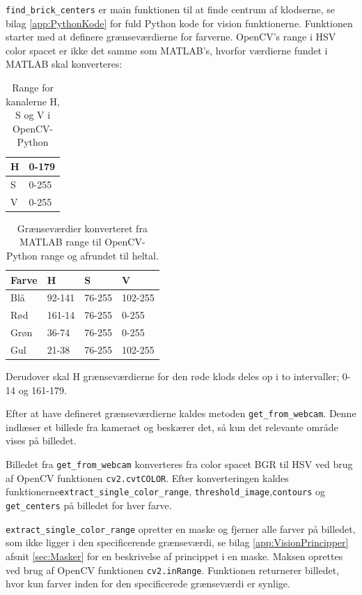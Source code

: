 \texttt{find\_brick\_centers} er main funktionen til at finde centrum af klodserne, se bilag \vref{app:PythonKode} for fuld Python kode for vision funktionerne.
Funktionen starter med at definere grænseværdierne for farverne.
OpenCV's range i HSV color spacet er ikke det samme som MATLAB's, hvorfor værdierne fundet i MATLAB skal konverteres:
\begin{table}[H]
\centering
\begin{tabular}{l|l}
H		&	0-179\\
\hline
S		&	0-255\\
\hline
V		&	0-255\\
\end{tabular}	
\caption{Range for kanalerne H, S og V i OpenCV-Python}
\end{table}

\begin{table}[H]
\centering
\begin{tabular}{l|l|l|l}
Farve	&	H			&	S			&	V	\\
\hline
Blå		&	92-141		&	76-255	&	102-255	\\
Rød		&	161-14		&	76-255	&	0-255	\\
Grøn	&	36-74		&	76-255	&	0-255	\\
Gul		&	21-38		&	76-255	&	102-255	\\
\end{tabular}	
\caption{Grænseværdier konverteret fra MATLAB range til OpenCV-Python range og afrundet til heltal.}
\end{table}

Derudover skal H grænseværdierne for den røde klods deles op i to intervaller; 0-14 og 161-179.

Efter at have defineret grænseværdierne kaldes metoden \texttt{get\_from\_webcam}. Denne indlæser et billede fra kameraet og beskærer det, så kun det relevante område vises på billedet.

Billedet fra \texttt{get\_from\_webcam} konverteres fra color spacet BGR til HSV ved brug af OpenCV funktionen \texttt{cv2.cvtCOLOR}.
Efter konverteringen kaldes funktionerne\newline \texttt{extract\_single\_color\_range}, \texttt{threshold\_image},\newline \texttt{contours} og \texttt{get\_centers} på billedet for hver farve.

\texttt{extract\_single\_color\_range} opretter en maske og fjerner alle farver på billedet, som ikke ligger i den specificerende grænseværdi, se bilag \ref{app:VisionPrincipper} afsnit \vref{sec:Masker} for en beskrivelse af princippet i en maske.
Maksen oprettes ved brug af OpenCV funktionen \texttt{cv2.inRange}.
Funktionen returnerer billedet, hvor kun farver inden for den specificerede grænseværdi er synlige.

